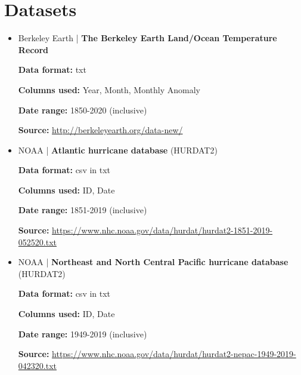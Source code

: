 \documentclass[fontsize=11pt]{article}
\begin{document}
\section*{Datasets}
\begin{itemize}

    \item Berkeley Earth | \textbf{The Berkeley Earth Land/Ocean Temperature Record}

    \medskip

    \textbf{Data format:} txt

    \textbf{Columns used:} Year, Month, Monthly Anomaly

    \textbf{Date range:} 1850-2020 (inclusive)

    \textbf{Source:}
    \url{http://berkeleyearth.org/data-new/}

    \bigskip

    \item NOAA | \textbf{Atlantic hurricane database} (HURDAT2)

    \medskip

    \textbf{Data format:} csv in txt

    \textbf{Columns used:} ID, Date

    \textbf{Date range:} 1851-2019 (inclusive)

    \textbf{Source:}
    \url{https://www.nhc.noaa.gov/data/hurdat/hurdat2-1851-2019-052520.txt}

    \bigskip

    \item NOAA | \textbf{Northeast and North Central Pacific hurricane database} (HURDAT2)

    \medskip

    \textbf{Data format:} csv in txt

    \textbf{Columns used:} ID, Date

    \textbf{Date range:} 1949-2019 (inclusive)

    \textbf{Source:}
    \url{https://www.nhc.noaa.gov/data/hurdat/hurdat2-nepac-1949-2019-042320.txt}

\end{itemize}
\end{document}
